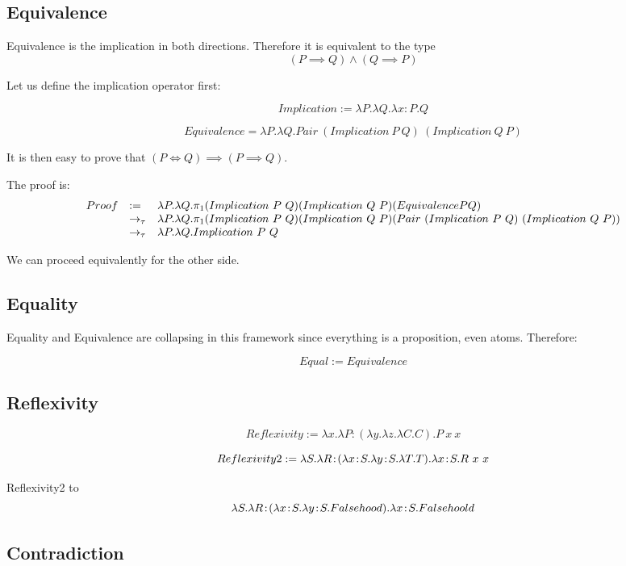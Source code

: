 \subsection{Equivalence}

Equivalence is the implication in both directions. Therefore it is equivalent to the type
\[
    (P \implies Q) \land (Q \implies P)
\]

Let us define the implication operator first:

\[
    Implication := \lambda P.\lambda Q.\lambda x:P.Q
\]

\[
    Equivalence = \lambda P.\lambda Q.Pair\ (Implication\ P\ Q)\ (Implication\ Q\ P) 
\]

It is then easy to prove that $(P \iff Q) \implies (P \implies Q)$.

The proof is:
\[
\begin{array}{lll}
    Proof   & :=        & \lambda P.\lambda Q.\pi_1 (Implication\ P\ Q) (Implication\ Q\ P) (Equivalence P Q)\\
            & \totau    & \lambda P.\lambda Q.\pi_1 (Implication\ P\ Q) (Implication\ Q\ P) (Pair\ (Implication\ P\ Q)\ (Implication\ Q\ P)) \\
            & \totau    & \lambda P.\lambda Q.Implication\ P\ Q
\end{array}
\]

We can proceed equivalently for the other side.

\subsection{Equality}

Equality and Equivalence are collapsing in this framework since everything is a proposition, even atoms. Therefore:

\[
    Equal := Equivalence
\]

\subsection{Reflexivity}

\[
    Reflexivity := \lambda x.\lambda P:(\lambda y.\lambda z.\lambda C.C).P\ x\ x
\]

\[
    Reflexivity2 := \lambda S.\tabs R:(\tabs x:S.\tabs y:S.\lambda T.T).\tabs x:S.\app {\app R x} {x}
\]

Reflexivity2 \taureduces to
\[
    \lambda S.\tabs R:(\tabs x:S.\tabs y:S.Falsehood).\tabs x:S.Falsehoold
\]

\subsection{Contradiction}

